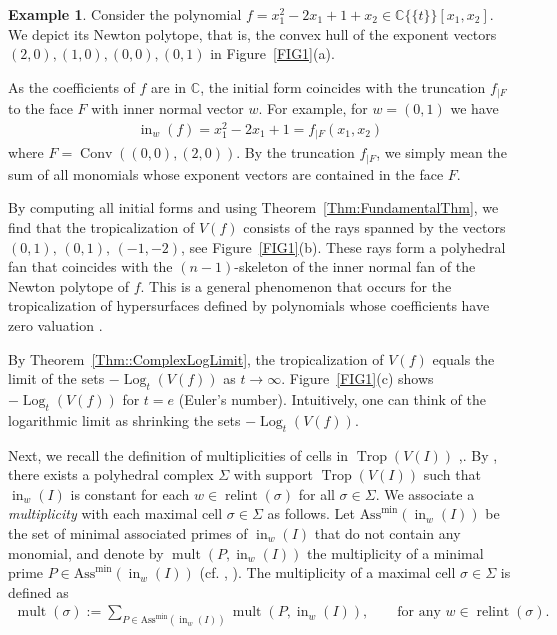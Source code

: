 \documentclass{article}
\theoremstyle{definition}
\newtheorem{example}[theorem]{Example}
\DeclareMathOperator{\Trop}{Trop}
\DeclareMathOperator{\Log}{Log}
\DeclareMathOperator{\Conv}{Conv}
\DeclareMathOperator{\relint}{relint}
\DeclareMathOperator{\mult}{mult}
\newcommand{\inw}{\operatorname{in}_w}
\begin{document}
\begin{example}
\label{Ex::ComplexTrop}
    Consider the polynomial $f = x_1^2-2x_1+1 + x_2 \in \mathbb{C}\{\!\{t \}\!\}[x_1,x_2]$. We depict its Newton polytope, that is, the convex hull of the exponent vectors $(2,0),(1,0),(0,0),(0,1)$ in Figure~\ref{FIG1}(a).
    
    As the coefficients of $f$ are in $\mathbb{C}$, the initial form coincides with the truncation $f_{|F}$ to the face $F$ with inner normal vector $w$. For example, for $w = (0,1)$ we have
    \begin{align}
    \label{Ex:InitForm}
     \inw(f) =  x_1^2 - 2 x_1 + 1 = f_{|F}(x_1,x_2)
     \end{align}
    where $F = \Conv((0,0),(2,0))$. By the truncation $f_{|F}$, we simply mean the sum of all monomials whose exponent vectors are contained in the face $F$.

    By computing all initial forms and using Theorem~\ref{Thm:FundamentalThm}, we find that the tropicalization of $V(f)$ consists of the rays spanned by the vectors $(0,1),\,(0,1),\,(-1,-2)$, see Figure~\ref{FIG1}(b). These rays form a polyhedral fan that coincides with the $(n-1)$-skeleton of the inner normal fan of the Newton polytope of $f$. This is a general phenomenon that occurs for the tropicalization of hypersurfaces defined by polynomials whose coefficients have zero valuation \cite[Theorem 3.1.3]{maclagan2015introduction}.

    By Theorem~\ref{Thm::ComplexLogLimit}, the tropicalization of $V(f)$ equals the limit of the sets $-\Log_t(V(f))$ as $t \to \infty$. Figure~\ref{FIG1}(c) shows   $-\Log_t(V(f))$ for $t = e$ (Euler's number). Intuitively, one can think of the logarithmic limit as shrinking the sets $-\Log_t(V(f))$.
\end{example}

Next, we recall the definition of multiplicities of cells in $\Trop(V(I))$  \cite[Section 3.4]{maclagan2015introduction},\cite[Definition 2.6]{Bossinger2017}.
By \cite[Theorem 2.2.1]{Speyer_Thesis}, there exists a polyhedral complex $\Sigma$ with support $ \Trop(V(I))$ such that $\inw(I)$ is constant for each $w \in \relint(\sigma)$ for all $\sigma \in \Sigma$.
We associate a \emph{multiplicity} with each maximal cell $\sigma \in \Sigma$ as follows. Let $\text{Ass}^\text{min}(\inw(I))$ be the set of minimal associated primes of $\inw(I)$ that do not contain any monomial, and denote by $\mult(P,\inw(I))$ the multiplicity of a minimal prime $P \in \text{Ass}^\text{min}(\inw(I))$ (cf. \cite[Definition 3.4.1]{maclagan2015introduction}, \cite[Chapter 3]{eisenbud1995commutative}). The multiplicity of a maximal cell $\sigma \in \Sigma$ is defined as
\begin{align}
\label{Eq:Multiplicity}
 \mult(\sigma) := \sum_{P \in\text{Ass}^\text{min}(\inw(I))} \mult(P,\inw(I)), \qquad \text{for any } w \in \relint(\sigma).  
 \end{align}
\end{document}
